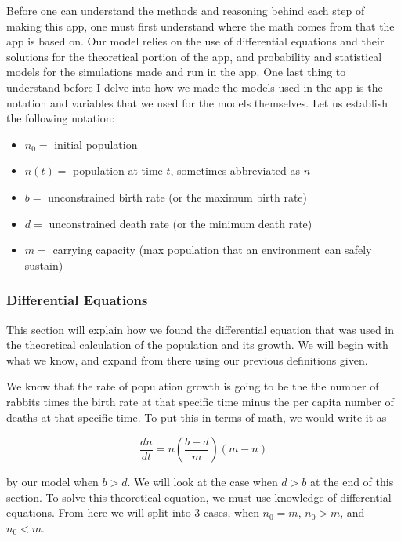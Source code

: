 \documentclass[titlepage]{article}\usepackage[]{graphicx}\usepackage[]{color}
\begin{document}
Before one can understand the methods and reasoning behind each step of making this app, one must first understand where the math comes from that the app is based on. Our model relies on the use of differential equations and their solutions for the theoretical portion of the app, and probability and statistical models for the simulations made and run in the app. One last thing to understand before I delve into how we made the models used in the app is the notation and variables that we used for the models themselves. Let us establish the following notation:

\begin{itemize}
\item \(n_0 =\) initial population

\item \(n(t) =\) population at time \(t\), sometimes abbreviated as \(n\)

\item \(b =\) unconstrained birth rate (or the maximum birth rate)

\item \(d =\) unconstrained death rate (or the minimum death rate)

\item \(m =\) carrying capacity (max population that an environment can safely sustain)

\end{itemize}

\subsubsection{Differential Equations}

This section will explain how we found the differential equation that was used in the theoretical calculation of the population and its growth. We will begin with what we know, and expand from there using our previous definitions given.

We know that the rate of population growth is going to be the the number of rabbits times the birth rate at that specific time minus the per capita number of deaths at that specific time. To put this in terms of math, we would write it as

\begin{equation}
\frac{dn}{dt} = n\left(\frac{b-d}{m}\right)(m-n) 
\end{equation}

\noindent by our model when \(b > d\). We will look at the case when \(d > b\) at the end of this section. To solve this theoretical equation, we must use knowledge of differential equations. From here we will split into 3 cases, when \(n_0 =m\), \(n_0 > m\), and \(n_0 < m\). 
\end{document}
